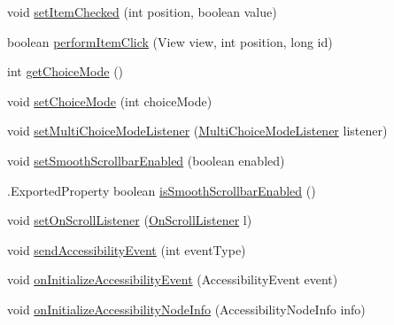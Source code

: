 \begin{DoxyCompactItemize}
\item 
void \hyperlink{classit_1_1sephiroth_1_1android_1_1library_1_1widget_1_1_abs_h_list_view_a99a00491ee5921f7ca14c58f50cbf4f3}{set\+Item\+Checked} (int position, boolean value)
\item 
boolean \hyperlink{classit_1_1sephiroth_1_1android_1_1library_1_1widget_1_1_abs_h_list_view_af1b08644b4a75b54df04df91dbe7ebd8}{perform\+Item\+Click} (View view, int position, long id)
\item 
int \hyperlink{classit_1_1sephiroth_1_1android_1_1library_1_1widget_1_1_abs_h_list_view_a0c7c28088fa0b5d950a0dbd6b2e62d11}{get\+Choice\+Mode} ()
\item 
void \hyperlink{classit_1_1sephiroth_1_1android_1_1library_1_1widget_1_1_abs_h_list_view_aac2532ddba38bddaecf4a009a9aa96fb}{set\+Choice\+Mode} (int choice\+Mode)
\item 
void \hyperlink{classit_1_1sephiroth_1_1android_1_1library_1_1widget_1_1_abs_h_list_view_aa4e373a73a002685779bef5bc216d65c}{set\+Multi\+Choice\+Mode\+Listener} (\hyperlink{interfaceit_1_1sephiroth_1_1android_1_1library_1_1util_1_1v11_1_1_multi_choice_mode_listener}{Multi\+Choice\+Mode\+Listener} listener)
\item 
void \hyperlink{classit_1_1sephiroth_1_1android_1_1library_1_1widget_1_1_abs_h_list_view_a926b68b154bc94af5b3329aceff1d0fc}{set\+Smooth\+Scrollbar\+Enabled} (boolean enabled)
\item 
.Exported\+Property boolean \hyperlink{classit_1_1sephiroth_1_1android_1_1library_1_1widget_1_1_abs_h_list_view_a24594cf8c5771568d8ae09d750e2378e}{is\+Smooth\+Scrollbar\+Enabled} ()
\item 
void \hyperlink{classit_1_1sephiroth_1_1android_1_1library_1_1widget_1_1_abs_h_list_view_af975c9d302a0d511ddb79a59d2ba7ef2}{set\+On\+Scroll\+Listener} (\hyperlink{interfaceit_1_1sephiroth_1_1android_1_1library_1_1widget_1_1_abs_h_list_view_1_1_on_scroll_listener}{On\+Scroll\+Listener} l)
\item 
void \hyperlink{classit_1_1sephiroth_1_1android_1_1library_1_1widget_1_1_abs_h_list_view_aaa58477b667851d7e7ee78c859c9c5fd}{send\+Accessibility\+Event} (int event\+Type)
\item 
void \hyperlink{classit_1_1sephiroth_1_1android_1_1library_1_1widget_1_1_abs_h_list_view_aba267fc43ca996cdac3c6b326511a997}{on\+Initialize\+Accessibility\+Event} (Accessibility\+Event event)
\item 
void \hyperlink{classit_1_1sephiroth_1_1android_1_1library_1_1widget_1_1_abs_h_list_view_a9ba31a1e3e84025347bfbda61d476ddd}{on\+Initialize\+Accessibility\+Node\+Info} (Accessibility\+Node\+Info info)

\end{DoxyCompactItemize}
